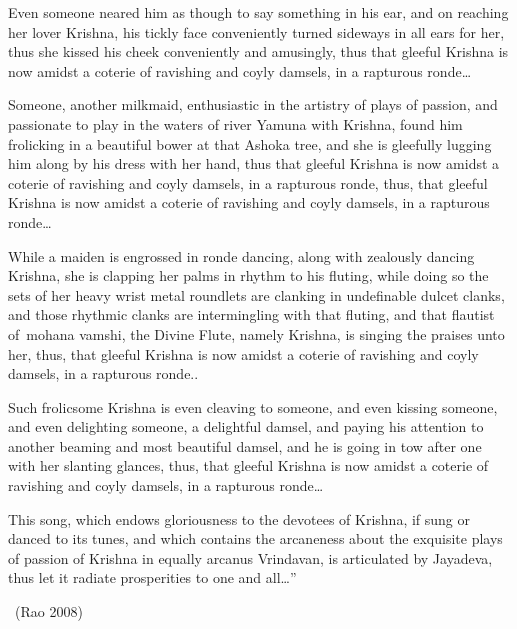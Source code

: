 \begin{myquote}
Even someone neared him as though to say something in his ear, and on reaching her lover Krishna, his tickly face conveniently turned sideways in all ears for her, thus she kissed his cheek conveniently and amusingly, thus that gleeful Krishna is now amidst a coterie of ravishing and coyly damsels, in a rapturous ronde…
\end{myquote}

\begin{myquote}
Someone, another milkmaid, enthusiastic in the artistry of plays of passion, and passionate to play in the waters of river Yamuna with Krishna, found him frolicking in a beautiful bower at that Ashoka tree, and she is gleefully lugging him along by his dress with her hand, thus that gleeful Krishna is now amidst a coterie of ravishing and coyly damsels, in a rapturous ronde, thus, that gleeful Krishna is now amidst a coterie of ravishing and coyly damsels, in a rapturous ronde…
\end{myquote}

\begin{myquote}
While a maiden is engrossed in ronde dancing, along with zealously dancing Krishna, she is clapping her palms in rhythm to his fluting, while doing so the sets of her heavy wrist metal roundlets are clanking in undefinable dulcet clanks, and those rhythmic clanks are intermingling with that fluting, and that flautist of mohana vamshi, the Divine Flute, namely Krishna, is singing the praises unto her, thus, that gleeful Krishna is now amidst a coterie of ravishing and coyly damsels, in a rapturous ronde..
\end{myquote}

\begin{myquote}
Such frolicsome Krishna is even cleaving to someone, and even kissing someone, and even delighting someone, a delightful damsel, and paying his attention to another beaming and most beautiful damsel, and he is going in tow after one with her slanting glances, thus, that gleeful Krishna is now amidst a coterie of ravishing and coyly damsels, in a rapturous ronde…
\end{myquote}

\begin{myquote}
This song, which endows gloriousness to the devotees of Krishna, if sung or danced to its tunes, and which contains the arcaneness about the exquisite plays of passion of Krishna in equally arcanus Vrindavan, is articulated by Jayadeva, thus let it radiate prosperities to one and all…” 

~\hfill (Rao 2008)
\end{myquote}

